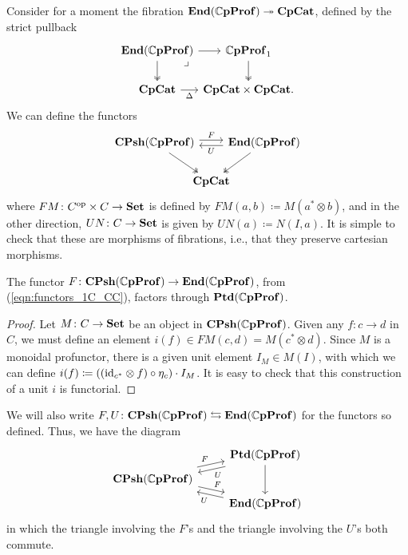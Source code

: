 \documentclass[11pt,oneside,article]{memoir}
\begin{document}
Consider for a moment the fibration $\mathbf{End}(\mathbb{C}\mathbf{pProf})\twoheadrightarrow\mathbf{CpCat}$, defined by the strict pullback
\[ \begin{tikzcd}[column sep=0em]
   \End(\dCompProf) \ar[d,two heads] \ar[r] \ar[dr,phantom,"\lrcorner" very near start]
      & \dCompProf_1 \ar[d,two heads] \\
   \CompCat \ar[r,"\Delta"']
      & \CompCat\times\CompCat.
\end{tikzcd} \]
We can define the functors
\begin{equation} \begin{tikzcd}[column sep=-1em]
   \label{eqn:functors_1C_CC}
   \CPsh(\dCompProf) \ar[rr,shift left,"F"] \ar[dr,two heads]
   && \End(\dCompProf) \ar[ll,shift left,"U"] \ar[dl,two heads] \\
   & \CompCat &
\end{tikzcd} \end{equation}
where $FM\colon{C}^{\text{op}}\times C\to\mathbf{Set}$ is defined by $FM(a,b)\coloneqq M(a^*\otimes b)$, and in the
other direction, $UN\colon C\to\mathbf{Set}$ is given by $UN(a)\coloneqq N(I,a)$. It is simple to check
that these are morphisms of fibrations, i.e., that they preserve cartesian morphisms.

\begin{proposition}
      \label{Prop:canonical unit}
   The functor $F\colon\mathbf{CPsh}(\mathbb{C}\mathbf{pProf})\to\mathbf{End}(\mathbb{C}\mathbf{pProf})$, from (\ref{eqn:functors_1C_CC}),
   factors through $\mathbf{Ptd}(\mathbb{C}\mathbf{pProf})$.
\end{proposition}
\begin{proof}
   Let $M\colon C\to\mathbf{Set}$ be an object in $\mathbf{CPsh}(\mathbb{C}\mathbf{pProf})$. Given any $f\colon c\to d$ in $ C$,
   we must define an element $i(f)\in FM(c,d)=M(c^*\otimes d)$. Since $M$ is a monoidal profunctor,
   there is a given unit element $I_M\in M(I)$, with which we can define $i(f)\coloneqq((\mathrm{id}_{c^*}\otimes
   f)\circ\eta_c)\cdot I_M$. It is easy to check that this construction of a unit $i$ is functorial.
\end{proof}

We will also write $F,U\colon\mathbf{CPsh}(\mathbb{C}\mathbf{pProf})\leftrightarrows\mathbf{End}(\mathbb{C}\mathbf{pProf})$ for the functors so
defined. Thus, we have the diagram
\begin{equation} \begin{tikzcd}[row sep=tiny]
      \label{eqn:ptd_functors_1C_CC}
   & \Ptd(\dCompProf) \ar[dd] \ar[dl,shift left,"U"] \\
   \CPsh(\dCompProf) \ar[ur,shift left,"F"] \ar[dr,shift left,"F"] & \\
   & \End(\dCompProf) \ar[ul,shift left,"U"]
\end{tikzcd} \end{equation}
in which the triangle involving the $F$'s and the triangle involving the $U$'s both commute.
\end{document}
